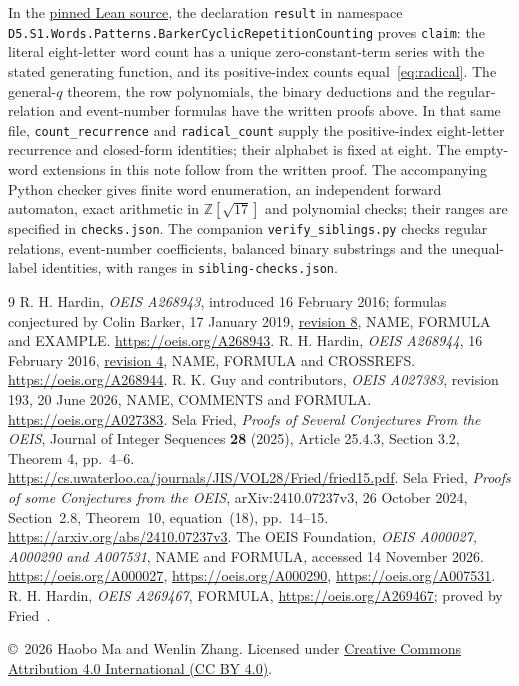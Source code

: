 \documentclass[11pt]{article}
\begin{document}
In the \href{https://github.com/the-omega-institute/trureturing/blob/8a9173761a0a8ce40a4238793b5c18e452f76446/D5/S1/Words/Patterns/BarkerCyclicRepetitionCounting.lean}{pinned Lean source},
the declaration \texttt{result} in namespace
\texttt{D5.S1.Words.Patterns.}\allowbreak\texttt{BarkerCyclicRepetitionCounting}
proves \texttt{claim}: the literal eight-letter word count has a unique
zero-constant-term series with the stated generating function, and its
positive-index counts equal~\eqref{eq:radical}. The general-$q$ theorem,
the row polynomials, the binary deductions and the regular-relation and
event-number formulas have the written proofs above. In that same file,
\texttt{count\_recurrence} and \texttt{radical\_count} supply the positive-index
eight-letter recurrence and closed-form identities; their alphabet is fixed at
eight. The empty-word extensions in this note follow from the written proof.
The accompanying Python checker gives finite word enumeration, an independent
forward automaton, exact arithmetic in $\mathbb Z[\sqrt{17}]$ and polynomial
checks; their ranges are specified in \texttt{checks.json}.
The companion \texttt{verify\_siblings.py} checks regular relations,
event-number coefficients, balanced binary substrings and the unequal-label
identities, with ranges in \texttt{sibling-checks.json}.

\begin{thebibliography}{9}
R. H. Hardin, \emph{OEIS A268943}, introduced 16 February 2016;
formulas conjectured by Colin Barker, 17 January 2019,
\href{https://oeis.org/history/view?seq=A268943&v=8}{revision 8},
NAME, FORMULA and EXAMPLE. \url{https://oeis.org/A268943}.
R. H. Hardin, \emph{OEIS A268944}, 16 February 2016,
\href{https://oeis.org/history/view?seq=A268944&v=4}{revision 4},
NAME, FORMULA and CROSSREFS. \url{https://oeis.org/A268944}.
R. K. Guy and contributors, \emph{OEIS A027383}, revision 193,
20 June 2026, NAME, COMMENTS and FORMULA. \url{https://oeis.org/A027383}.
Sela Fried, \emph{Proofs of Several Conjectures From the OEIS},
Journal of Integer Sequences \textbf{28} (2025), Article 25.4.3,
Section 3.2, Theorem 4, pp.~4--6.
\url{https://cs.uwaterloo.ca/journals/JIS/VOL28/Fried/fried15.pdf}.
Sela Fried, \emph{Proofs of some Conjectures from the OEIS},
arXiv:2410.07237v3, 26 October 2024, Section~2.8, Theorem~10,
equation~(18), pp.~14--15. \url{https://arxiv.org/abs/2410.07237v3}.
The OEIS Foundation, \emph{OEIS A000027, A000290 and A007531},
NAME and FORMULA, accessed 14 November 2026.
\url{https://oeis.org/A000027}, \url{https://oeis.org/A000290},
\url{https://oeis.org/A007531}.
R. H. Hardin, \emph{OEIS A269467}, FORMULA,
\url{https://oeis.org/A269467}; proved by Fried~\cite[Corollary~5]{fried}.
\end{thebibliography}
\medskip\noindent
\small \copyright\ 2026 Haobo Ma and Wenlin Zhang.
Licensed under \href{https://creativecommons.org/licenses/by/4.0/}{Creative Commons Attribution 4.0 International (CC BY 4.0)}.
\end{document}
